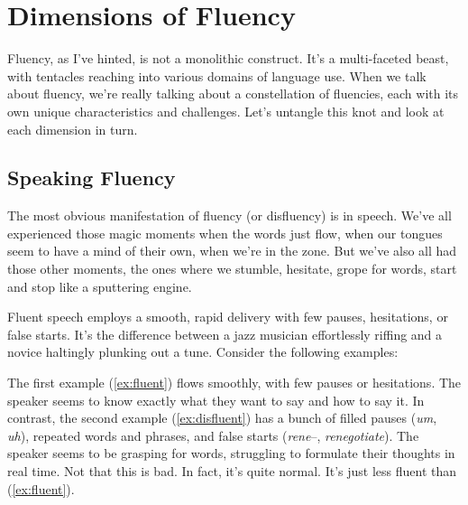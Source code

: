 \section{Dimensions of Fluency}

Fluency, as I've hinted, is not a monolithic construct. It's a multi-faceted beast, with tentacles reaching into various domains of language use. When we talk about fluency, we're really talking about a constellation of fluencies, each with its own unique characteristics and challenges. Let's untangle this knot and look at each dimension in turn.

\subsection{Speaking Fluency}

The most obvious manifestation of fluency (or disfluency) is in speech. We've all experienced those magic moments when the words just flow, when our tongues seem to have a mind of their own, when we're in the zone. But we've also all had those other moments, the ones where we stumble, hesitate, grope for words, start and stop like a sputtering engine.

Fluent speech employs a smooth, rapid delivery with few pauses, hesitations, or false starts. It's the difference between a jazz musician effortlessly riffing and a novice haltingly plunking out a tune. Consider the following examples:

\ea
    \label{ex:fluent}
    \label{ex:disfluent}
    \z
\z

The first example (\ref{ex:fluent}) flows smoothly, with few pauses or hesitations. The speaker seems to know exactly what they want to say and how to say it. In contrast, the second example (\ref{ex:disfluent}) has a bunch of filled pauses (\textit{um}, \textit{uh}), repeated words and phrases, and false starts (\textit{rene}--, \textit{renegotiate}). The speaker seems to be grasping for words, struggling to formulate their thoughts in real time. Not that this is bad. In fact, it's quite normal. It's just less fluent than (\ref{ex:fluent}).

